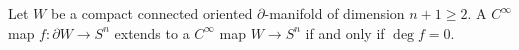 Let $W$ be a compact connected oriented $\partial$-manifold of dimension $n+1 \geqslant 2$. A $C^{\infty}$ map $f \colon \partial W \to S^{n}$ extends to a $C^{\infty}$ map $W \to S^{n}$ if and only if $\deg f = 0$.
